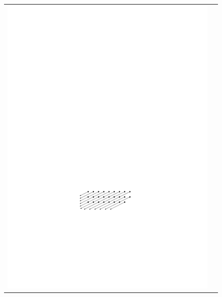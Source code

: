 \documentclass{ws-ijcga}
\begin{document}
\begin{figure}
\begin{tabular}{cc}
     \includegraphics[scale=0.9]{j3} & 

\end{tabular}
\end{figure}
\end{document}
